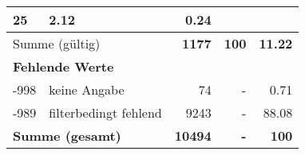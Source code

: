 \begin{longtable}{lXrrr}
       \num{25} &
       \num[round-mode=places,round-precision=2]{2.12} &
         \num[round-mode=places,round-precision=2]{0.24} \\
     \midrule
     \multicolumn{2}{l}{Summe (gültig)} &
       \textbf{\num{1177}} &
     \textbf{\num{100}} &
       \textbf{\num[round-mode=places,round-precision=2]{11.22}} \\
     \multicolumn{5}{l}{\textbf{Fehlende Werte}}\\
       -998 &
       keine Angabe &
         \num{74} &
        - &
         \num[round-mode=places,round-precision=2]{0.71} \\
       -989 &
       filterbedingt fehlend &
         \num{9243} &
        - &
         \num[round-mode=places,round-precision=2]{88.08} \\
     \midrule
     \multicolumn{2}{l}{\textbf{Summe (gesamt)}} &
          \textbf{\num{10494}} &
        \textbf{-} &
        \textbf{\num{100}} \\
     \bottomrule
     \end{longtable}
     
